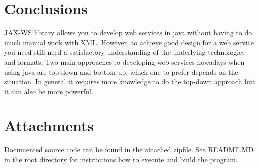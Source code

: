 \documentclass[a4paper, 11pt]{article}
\begin{document}
\section*{Conclusions}
JAX-WS library allows you to develop web services in java without having to do much manual work with XML. However, to achieve good design for a web service you need still need a satisfactory understanding of the underlying technologies and formats. Two main approaches to developing web services nowadays when using java are top-down and bottom-up, which one to prefer depends on the situation. In general it requires more knowledge to do the top-down approach but it can also be more powerful.

\section*{Attachments}
Documented source code can be found in the attached zipfile. See README.MD in the root directory for instructions how to execute and build the program.

{}

\end{document}
